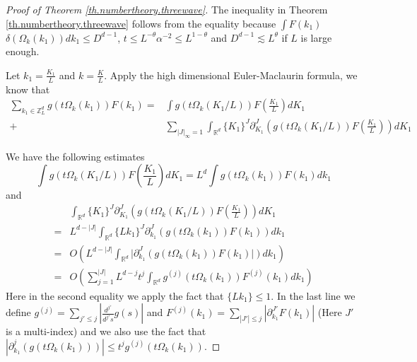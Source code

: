 \begin{proof}[Proof of Theorem \ref{th.numbertheory.threewave}] The inequality in Theorem \ref{th.numbertheory.threewave} follows from the equality because $\int F(k_1)$ $ \delta(\Omega_k(k_1)) dk_1\le D^{d-1}$, $t\le L^{-\theta}\alpha^{-2}\le L^{1-\theta}$ and $D^{d-1}\lesssim L^{\theta}$ if $L$ is large enough.

Let $k_{1}=\frac{K_1}{L}$ and $k=\frac{K}{L}$. Apply the high dimensional Euler-Maclaurin formula, we know that
\begin{equation}
\begin{split}
    \sum_{k_1\in \mathbb{Z}_L^d} g(t\Omega_k(k_1)) F(k_1)=&\int g(t\Omega_k(K_1/L)) F\left(\frac{K_1}{L}\right) dK_1 
    \\
    +& \sum_{ |J|_{\infty} = 1}\int_{\mathbb{R}^d} \{K_1\}^{J} \partial_{K_1}^{J}\left(g(t\Omega_k(K_1/L)) F\left(\frac{K_1}{L}\right)\right) dK_1
\end{split}
\end{equation}

We have the following estimates
\begin{equation}\label{eq.asymptoticlemmaeq1.threewave}
    \int g(t\Omega_k(K_1/L)) F\left(\frac{K_1}{L}\right) dK_1 =L^d\int g(t\Omega_k(k_1)) F(k_1) dk_1 
\end{equation}
and
\begin{equation}\label{eq.asymptoticlemmaeq2.threewave}
\begin{split}
    &\int_{\mathbb{R}^d} \{K_1\}^{J} \partial_{K_1}^{J}\left(g(t\Omega_k(K_1/L)) F\left(\frac{K_1}{L}\right)\right) dK_1
    \\
    = &L^{d-|J|}\int_{\mathbb{R}^d} \{Lk_1\}^{J} \partial_{k_1}^{J}\left(g(t\Omega_k(k_1)) F(k_1)\right) dk_1
    \\
    = &O\left(L^{d-|J|}\int_{\mathbb{R}^d}  |\partial_{k_1}^{J}\left(g(t\Omega_k(k_1))F(k_1)|\right) dk_1\right)
    \\
    = &O\left(\sum^{|J|}_{j=1}L^{d-j}t^{j}\int_{\mathbb{R}^d}  g^{(j)}(t\Omega_k(k_1))F^{(j)}(k_1) dk_1 \right)
\end{split}
\end{equation}
Here in the second equality we apply the fact that $\{Lk_1\}\le 1$. In the last line we define $g^{(j)}=\sum_{j'\le j} \left|\frac{d^{j'}}{d^{j'}s}g(s)\right|$ and $F^{(j)}(k_1)=\sum_{|J'|\le j}|\partial^{J'}_{k_1}F(k_1)|$ (Here $J'$ is a multi-index) and we also use the fact that $|\partial_{k_1}^{j}(g(t\Omega_k(k_1)))|\le t^{j} g^{(j)}(t\Omega_k(k_1))$. 


\end{proof}
